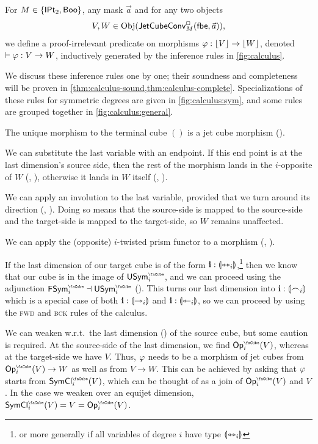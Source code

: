 \documentclass[a4paper]{memoir}
\begin{document}
\begin{definition} \label{def:calculus}
	For $M \in \mathopen{}\left\{ {\mathsf{IPt}_2}, \mathsf{Boo} \right\}\mathclose{}$, any mask $\vec a$ and for any two objects
	\[
		V, W \in \mathrm{Obj}(\mathsf{JetCubeConv}^{\Box}_{M}\mathopen{}\left( {\mathsf{fbe}},\vec a \right)\mathclose{}),
	\]
	we define a proof-irrelevant predicate on morphisms $\varphi : \mathopen{}\left\lfloor V \right\rfloor\mathclose{} \to \mathopen{}\left\lfloor W \right\rfloor\mathclose{}$, denoted $\vdash \varphi : V \to W$, inductively generated by the inference rules in \cref{fig:calculus}.
\end{definition}
We discuss these inference rules one by one; their soundness and completeness will be proven in \cref{thm:calculus-sound,thm:calculus-complete}.
Specializations of these rules for symmetric degrees are given in \cref{fig:calculus:sym}, and some rules are grouped together in \cref{fig:calculus:general}.

The unique morphism to the terminal cube $()$ is a jet cube morphism ().

We can substitute the last variable with an endpoint. If this end point is at the last dimension's source side, then the rest of the morphism lands in the $i$-opposite of $W$ (, ), otherwise it lands in $W$ itself (, ).

We can apply an involution to the last variable, provided that we turn around its direction (, ). Doing so means that the source-side is mapped to the source-side and the target-side is mapped to the target-side, so $W$ remains unaffected.

We can apply the (opposite) $i$-twisted prism functor to a morphism (, ).

If the last dimension of our target cube is of the form $\mathbf{i} : {\llparenthesis \leftrightarrowtriangle_i \rrparenthesis}$,\footnote{or more generally if all variables of degree $i$ have type ${\llparenthesis \leftrightarrowtriangle_i \rrparenthesis}$} then we know that our cube is in the image of $\Usymcube_i$, and we can proceed using the adjunction $\Fsymcube_i \dashv \Usymcube_i$ ().
This turns our last dimension into $\mathbf{i} : {\llparenthesis \frown_i \rrparenthesis}$ which is a special case of both $\mathbf{i} : {\llparenthesis \rightarrowtriangle_i \rrparenthesis}$ and $\mathbf{i} : {\llparenthesis \leftarrowtriangle_i \rrparenthesis}$, so we can proceed by using the \textsc{fwd} and \textsc{bck} rules of the calculus.

We can weaken w.r.t.\ the last dimension () of the source cube, but some caution is required. At the source-side of the last dimension, we find $\Opcube_i(V)$, whereas at the target-side we have $V$.
Thus, $\varphi$ needs to be a morphism of jet cubes from $\Opcube_i(V) \to W$ as well as from $V \to W$.
This can be achieved by asking that $\varphi$ starts from $\UFsymcube_i(V)$, which can be thought of as a join of $\Opcube_i(V)$ and $V$. In the case we weaken over an equijet dimension, $\UFsymcube_i(V) = V = \Opcube_i(V)$.
\end{document}
